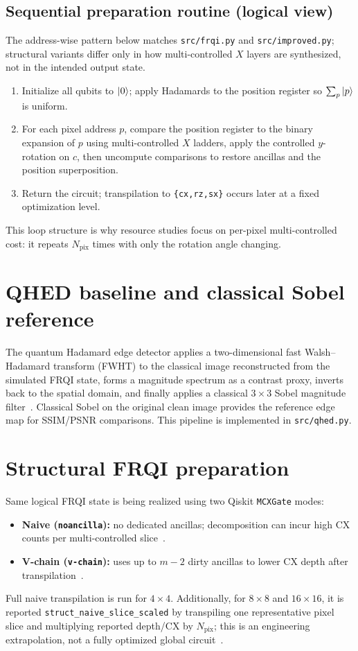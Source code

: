 \subsection{Sequential preparation routine (logical view)}
\label{sec:frqi-seq}
The address-wise pattern below matches \texttt{src/frqi.py} and \texttt{src/improved.py}; structural variants differ only in how multi-controlled $X$ layers are synthesized, not in the intended output state.
\begin{enumerate}[label=\textbf{\arabic*.}, leftmargin=*]
  \item Initialize all qubits to $\ket{0}$; apply Hadamards to the position register so $\sum_p \ket{p}$ is uniform.
  \item For each pixel address $p$, compare the position register to the binary expansion of $p$ using multi-controlled $X$ ladders, apply the controlled $y$-rotation on $c$, then uncompute comparisons to restore ancillas and the position superposition.
  \item Return the circuit; transpilation to \texttt{\{cx,rz,sx\}} occurs later at a fixed optimization level.
\end{enumerate}
This loop structure is why resource studies focus on per-pixel multi-controlled cost: it repeats $N_{\mathrm{pix}}$ times with only the rotation angle changing.

\section{QHED baseline and classical Sobel reference}
The quantum Hadamard edge detector applies a two-dimensional fast Walsh--Hadamard transform (FWHT) to the classical image reconstructed from the simulated FRQI state, forms a magnitude spectrum as a contrast proxy, inverts back to the spatial domain, and finally applies a classical $3\times 3$ Sobel magnitude filter~\cite{Yao2017QHED,QiskitTextbookQuantumEdgeDetection}. Classical Sobel on the original clean image provides the reference edge map for SSIM/PSNR comparisons. This pipeline is implemented in \texttt{src/qhed.py}.

\section{Structural FRQI preparation}
Same logical FRQI state is being realized using two Qiskit \texttt{MCXGate} modes:
\begin{itemize}
  \item \textbf{Naive (\texttt{noancilla}):} no dedicated ancillas; decomposition can incur high CX counts per multi-controlled slice~\cite{Zindorf2024EfficientMCG}.
  \item \textbf{V-chain (\texttt{v-chain}):} uses up to $m-2$ dirty ancillas to lower CX depth after transpilation~\cite{Vale2023MCSU2,Azevedo2024LowDepthMCG}.
\end{itemize}
Full naive transpilation is run for $4\times 4$. Additionally, for $8\times 8$ and $16\times 16$, it is reported \texttt{struct\_naive\_slice\_scaled} by transpiling one representative pixel slice and multiplying reported depth/CX by $N_{\mathrm{pix}}$; this is an engineering extrapolation, not a fully optimized global circuit~\cite{Arsoski2024MCXQFT}.


